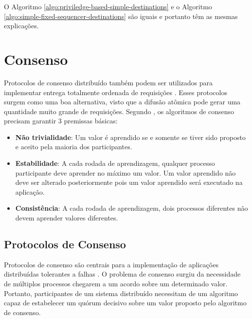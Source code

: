 

O Algoritmo \ref{algo:priviledge-based-simple-destinations} e o Algoritmo \ref{algo:simple-fixed-sequencer-destinations} são iguais e portanto têm as mesmas explicações.

\section{Consenso}
\label{sec:consenso}

Protocolos de consenso distribuído também podem ser utilizados para implementar entrega totalmente ordenada de requisições \cite{conf/dsn/EkwallS06, MilosevicHutleSchiper2011}. Esses protocolos surgem como uma boa alternativa, visto que a difusão atômica pode gerar uma quantidade muito grande de requisições. Segundo \textcite{lamport2001paxos}, os algoritmos de consenso precisam garantir 3 premissas básicas:

\begin{itemize}
\item \textbf{Não trivialidade}: Um valor é aprendido se e somente se tiver sido proposto e aceito pela maioria dos participantes.

\item \textbf{Estabilidade}: A cada rodada de aprendizagem, qualquer processo participante deve aprender no máximo um valor. Um valor aprendido não deve ser alterado posteriormente pois um valor aprendido será executado na aplicação.

\item \textbf{Consistência}: A cada rodada de aprendizagem, dois processos diferentes não devem aprender valores diferentes.
\end{itemize}

\subsection{Protocolos de Consenso}

Protocolos de consenso são centrais para a implementação de aplicações distribuídas tolerantes a falhas \cite{cason2017role}.
O problema de consenso surgiu da necessidade de múltiplos
processos chegarem a um acordo sobre um determinado valor. 
Portanto, participantes de um sistema distribuído
necessitam de
um algoritmo capaz de estabelecer 
um quórum decisivo sobre um valor proposto pelo algoritmo de consenso.

